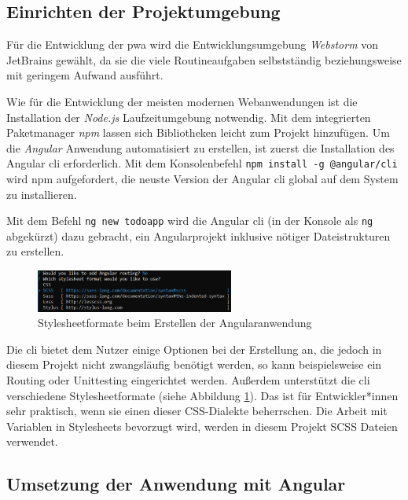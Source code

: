 \subsection{Einrichten der Projektumgebung}
Für die Entwicklung der \ac{pwa} wird die Entwicklungsumgebung \textit{Webstorm} von JetBrains gewählt, da sie die viele Routineaufgaben selbstständig beziehungsweise mit geringem Aufwand ausführt.

Wie für die Entwicklung der meisten modernen Webanwendungen ist die Installation der \textit{Node.js} Laufzeitumgebung notwendig. Mit dem integrierten Paketmanager \textit{npm} lassen sich Bibliotheken leicht zum Projekt hinzufügen.
Um die \textit{Angular} Anwendung automatisiert zu erstellen, ist zuerst die Installation des Angular \acf{cli} erforderlich. Mit dem Konsolenbefehl \texttt{npm install -g @angular/cli} wird npm aufgefordert, die neuste Version der Angular \ac{cli} global auf dem System zu installieren.


Mit dem Befehl \texttt{ng new todoapp} wird die Angular \ac{cli} (in der Konsole als \texttt{ng} abgekürzt) dazu gebracht, ein Angularprojekt inklusive nötiger Dateistrukturen zu erstellen.
\begin{figure}
	\vspace{-10pt}
	\includegraphics[width=0.58\textwidth]{img/angular_cli_css.PNG}
	\caption{Stylesheetformate beim Erstellen der Angularanwendung}
	\label{fig:stylesheet_formate_cli}
	\vspace{-10pt}
\end{figure}
Die \ac{cli} bietet dem Nutzer einige Optionen bei der Erstellung an, die jedoch in diesem Projekt nicht zwangsläufig benötigt werden, so kann beispielsweise ein Routing oder Unittesting eingerichtet werden.
Außerdem unterstützt die \ac{cli} verschiedene Stylesheetformate (siehe Abbildung \ref{fig:stylesheet_formate_cli}). Das ist für Entwickler*innen sehr praktisch, wenn sie einen dieser CSS-Dialekte beherrschen. Die Arbeit mit Variablen in Stylesheets bevorzugt wird, werden in diesem Projekt SCSS Dateien verwendet.


\subsection{Umsetzung der Anwendung mit Angular}

